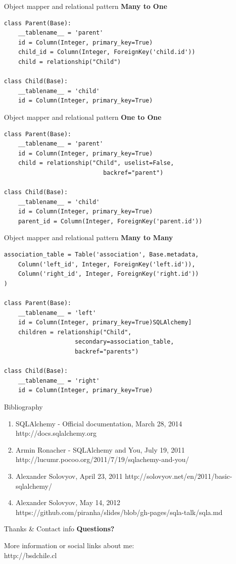 \documentclass[seagull]{beamer}
\begin{document}
\begin{frame}[fragile]{Object mapper and relational pattern}
\textbf{Many to One}
\begin{verbatim}
class Parent(Base):
    __tablename__ = 'parent'
    id = Column(Integer, primary_key=True)
    child_id = Column(Integer, ForeignKey('child.id'))
    child = relationship("Child")

class Child(Base):
    __tablename__ = 'child'
    id = Column(Integer, primary_key=True)
\end{verbatim}
\end{frame}

\begin{frame}[fragile]{Object mapper and relational pattern}
\textbf{One to One}
\begin{verbatim}
class Parent(Base):
    __tablename__ = 'parent'
    id = Column(Integer, primary_key=True)
    child = relationship("Child", uselist=False, 
    						backref="parent")

class Child(Base):
    __tablename__ = 'child'
    id = Column(Integer, primary_key=True)
    parent_id = Column(Integer, ForeignKey('parent.id'))
\end{verbatim}
\end{frame}

\begin{frame}[fragile]{Object mapper and relational pattern}
\textbf{Many to Many}
\begin{verbatim}
association_table = Table('association', Base.metadata,
    Column('left_id', Integer, ForeignKey('left.id')),
    Column('right_id', Integer, ForeignKey('right.id'))
)

class Parent(Base):
    __tablename__ = 'left'
    id = Column(Integer, primary_key=True)SQLAlchemy]
    children = relationship("Child",
                    secondary=association_table,
                    backref="parents")

class Child(Base):
    __tablename__ = 'right'
    id = Column(Integer, primary_key=True)
\end{verbatim}
\end{frame}

\begin{frame}{Bibliography}
\begin{enumerate}
\item SQLAlchemy - Official documentation, March 28, 2014 http://docs.sqlalchemy.org
\item Armin Ronacher - SQLAlchemy and You, July 19, 2011 http://lucumr.pocoo.org/2011/7/19/sqlachemy-and-you/
\item Alexander Solovyov, April 23, 2011 http://solovyov.net/en/2011/basic-sqlalchemy/
\item Alexander Solovyov, May 14, 2012 https://github.com/piranha/slides/blob/gh-pages/sqla-talk/sqla.md
\end{enumerate}
\end{frame}

\begin{frame}{Thanks \& Contact info}
\centering\textbf{Questions?}
\\
\begin{small}
More information or social links about me:\\
http://bsdchile.cl
\end{small}
\end{frame}

\begin{frame}{}

\end{frame}
\end{document}
